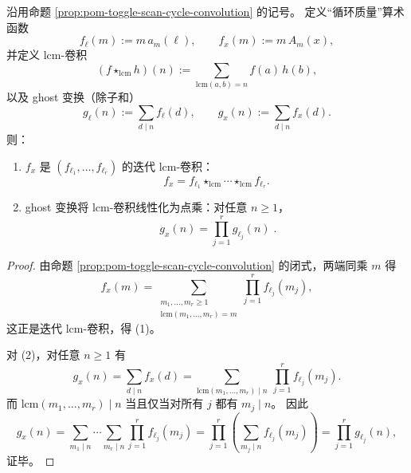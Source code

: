 \begin{theorem}\label{thm:pom-toggle-scan-cycle-ghost-multiplicativity}
沿用命题 \ref{prop:pom-toggle-scan-cycle-convolution} 的记号。
定义“循环质量”算术函数
\[
f_\ell(m):=m\,a_m(\ell),\qquad
f_x(m):=m\,A_m(x),
\]
并定义 \(\mathrm{lcm}\)-卷积
\[
(f\star_{\mathrm{lcm}}h)(n):=\sum_{\mathrm{lcm}(a,b)=n} f(a)\,h(b),
\]
以及 ghost 变换（除子和）
\[
g_\ell(n):=\sum_{d\mid n} f_\ell(d),\qquad
g_x(n):=\sum_{d\mid n} f_x(d).
\]
则：
\begin{enumerate}
  \item \(f_x\) 是 \((f_{\ell_1},\dots,f_{\ell_r})\) 的迭代 \(\mathrm{lcm}\)-卷积：
  \[
  f_x=f_{\ell_1}\star_{\mathrm{lcm}}\cdots\star_{\mathrm{lcm}} f_{\ell_r}.
  \]
  \item ghost 变换将 \(\mathrm{lcm}\)-卷积线性化为点乘：对任意 \(n\ge 1\)，
  \[
  \boxed{\;
  g_x(n)=\prod_{j=1}^r g_{\ell_j}(n)\; }.
  \]
\end{enumerate}
\end{theorem}
\begin{proof}
由命题 \ref{prop:pom-toggle-scan-cycle-convolution} 的闭式，两端同乘 \(m\) 得
\[
f_x(m)
=\sum_{\substack{m_1,\dots,m_r\ge 1\\ \mathrm{lcm}(m_1,\dots,m_r)=m}}
\prod_{j=1}^r f_{\ell_j}(m_j),
\]
这正是迭代 \(\mathrm{lcm}\)-卷积，得 (1)。
\par
对 (2)，对任意 \(n\ge 1\) 有
\[
g_x(n)
=\sum_{d\mid n} f_x(d)
=\sum_{\mathrm{lcm}(m_1,\dots,m_r)\mid n}\ \prod_{j=1}^r f_{\ell_j}(m_j).
\]
而 \(\mathrm{lcm}(m_1,\dots,m_r)\mid n\) 当且仅当对所有 \(j\) 都有 \(m_j\mid n\)。
因此
\[
g_x(n)
=\sum_{m_1\mid n}\cdots\sum_{m_r\mid n}\prod_{j=1}^r f_{\ell_j}(m_j)
=\prod_{j=1}^r\left(\sum_{m_j\mid n} f_{\ell_j}(m_j)\right)
=\prod_{j=1}^r g_{\ell_j}(n),
\]
证毕。
\end{proof}

